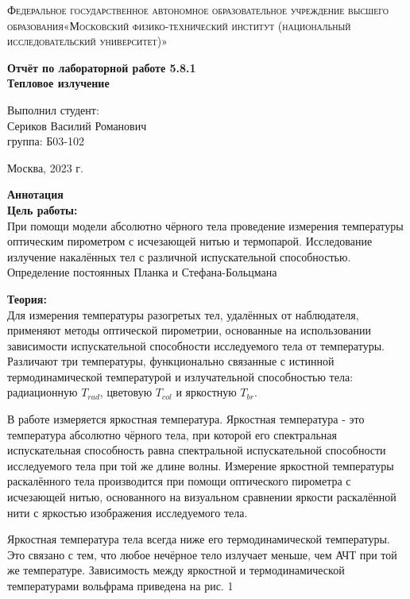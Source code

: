 \documentclass[a4paper, 12pt]{article}%
\begin{document}
	\begin{titlepage}
		\begin{center}
			\textsc{Федеральное государственное автономное образовательное учреждение высшего образования«Московский физико-технический институт (национальный исследовательский университет)»\\[5mm]
			}
			
			\vfill
			
			\textbf{Отчёт по лабораторной работе 5.8.1\\[3mm]
				Тепловое излучение
				\\[50mm]
			}
			
		\end{center}
		
		\hfill
		\begin{minipage}{.5\textwidth}
			Выполнил студент:\\[2mm]
			Сериков Василий Романович\\[2mm]
			группа: Б03-102\\[5mm]
			
		\end{minipage}
		\vfill
		\begin{center}
			Москва, 2023 г.
		\end{center}
		
	\end{titlepage}
	
	\newpage
	\setcounter{page}{2}
	\textbf{Аннотация}\\
	
	\textbf{Цель работы: }\\
	
	При помощи модели абсолютно чёрного тела проведение измерения температуры оптическим пирометром с исчезающей нитью и термопарой. Исследование излучение накалённых тел с различной испускательной способностью. Определение постоянных Планка и Стефана-Больцмана
	
	\textbf{Теория: }\\
	
	Для измерения температуры разогретых тел, удалённых от наблюдателя, применяют методы оптической пирометрии, основанные на использовании зависимости испускательной способности исследуемого тела от температуры. Различают три температуры, функционально связанные с истинной термодинамической температурой и излучательной способностью тела: радиационную $T_{rad}$, цветовую $T_{col}$ и яркостную $T_{br}$. \par
	В работе измеряется яркостная температура. Яркостная температура - это температура абсолютно чёрного тела, при которой его спектральная испускательная способность равна спектральной испускательной способности исследуемого тела при той же длине волны.
	Измерение яркостной температуры раскалённого тела производится при помощи оптического пирометра с исчезающей нитью, основанного на визуальном сравнении яркости раскалённой нити с яркостью изображения исследуемого тела. \par
	Яркостная температура тела всегда ниже его термодинамической температуры. Это связано с тем, что любое нечёрное тело излучает меньше, чем АЧТ при той же температуре. Зависимость между яркостной и термодинамической температурами вольфрама приведена на рис. 1
	
\end{document}
